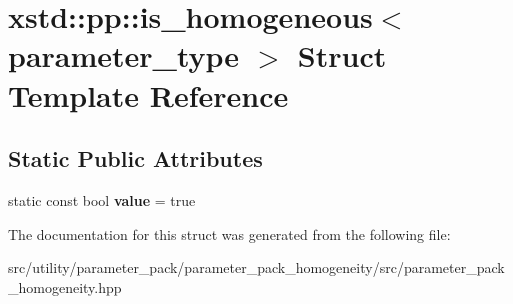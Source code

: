 \hypertarget{structxstd_1_1pp_1_1is__homogeneous_3_01parameter__type_01_4}{\section{xstd\-:\-:pp\-:\-:is\-\_\-homogeneous$<$ parameter\-\_\-type $>$ Struct Template Reference}
\label{structxstd_1_1pp_1_1is__homogeneous_3_01parameter__type_01_4}
}
\subsection*{Static Public Attributes}
\begin{DoxyCompactItemize}
\item 
\hypertarget{structxstd_1_1pp_1_1is__homogeneous_3_01parameter__type_01_4_a827e8f99e9ec9a203c3851ecd58dddb6}{static const bool {\bfseries value} = true}\label{structxstd_1_1pp_1_1is__homogeneous_3_01parameter__type_01_4_a827e8f99e9ec9a203c3851ecd58dddb6}

\end{DoxyCompactItemize}


The documentation for this struct was generated from the following file\-:\begin{DoxyCompactItemize}
\item 
src/utility/parameter\-\_\-pack/parameter\-\_\-pack\-\_\-homogeneity/src/parameter\-\_\-pack\-\_\-homogeneity.\-hpp\end{DoxyCompactItemize}
